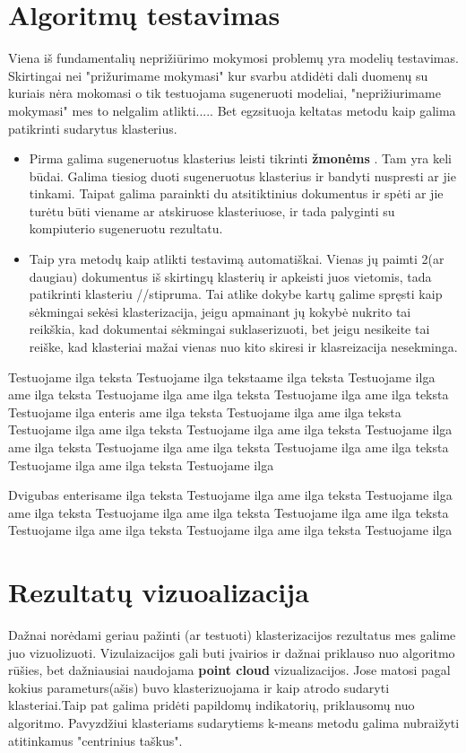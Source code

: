 \documentclass{VUMIFInfKursinis}
\begin{document}
\section{Algoritmų testavimas}
Viena iš fundamentalių neprižiūrimo mokymosi problemų yra modelių testavimas. Skirtingai nei "prižurimame mokymasi" kur svarbu atdidėti dali duomenų su kuriais nėra mokomasi o tik testuojama sugeneruoti modeliai, "neprižiurimame mokymasi" mes to nelgalim atlikti..... Bet egzsituoja keltatas metodu kaip galima patikrinti sudarytus klasterius.
\begin{itemize}
	\item Pirma galima sugeneruotus klasterius leisti tikrinti \textbf{žmonėms }. Tam yra keli būdai. Galima tiesiog duoti sugeneruotus klasterius ir bandyti nuspresti ar jie tinkami. Taipat galima parainkti du atsitiktinius dokumentus ir spėti ar jie turėtu būti viename ar atskiruose klasteriuose, ir tada palyginti su kompiuterio sugeneruotu rezultatu. 
	\item Taip yra metodų kaip atlikti testavimą automatiškai. Vienas jų paimti 2(ar daugiau) dokumentus iš skirtingų klasterių ir apkeisti juos vietomis, tada patikrinti klasteriu //stipruma. Tai atlike dokybe kartų galime spręsti kaip sėkmingai sekėsi klasterizacija, jeigu apmainant jų kokybė nukrito tai reikškia, kad dokumentai sėkmingai suklaserizuoti, bet jeigu nesikeite tai reiške, kad klasteriai mažai vienas nuo kito skiresi ir klasreizacija nesekminga.
\end{itemize}
Testuojame ilga teksta Testuojame ilga tekstaame ilga teksta Testuojame ilga ame ilga teksta Testuojame ilga ame ilga teksta Testuojame ilga ame ilga teksta Testuojame ilga 
enteris ame ilga teksta Testuojame ilga ame ilga teksta Testuojame ilga ame ilga teksta Testuojame ilga ame ilga teksta Testuojame ilga ame ilga teksta Testuojame ilga ame ilga teksta Testuojame ilga ame ilga teksta Testuojame ilga ame ilga teksta Testuojame ilga

Dvigubas enterisame ilga teksta Testuojame ilga ame ilga teksta Testuojame ilga ame ilga teksta Testuojame ilga ame ilga teksta Testuojame ilga ame ilga teksta Testuojame ilga ame ilga teksta Testuojame ilga ame ilga teksta Testuojame ilga 
\section{Rezultatų vizuoalizacija}
Dažnai norėdami geriau pažinti (ar testuoti) klasterizacijos rezultatus mes galime juo vizuolizuoti. Vizulaizacijos gali buti įvairios ir dažnai priklauso nuo algoritmo rūšies, bet dažniausiai naudojama \textbf{point cloud} vizualizacijos. Jose matosi pagal kokius parameturs(ašis) buvo klasterizuojama ir kaip atrodo sudaryti klasteriai.Taip pat galima pridėti papildomų indikatorių, priklausomų nuo algoritmo. Pavyzdžiui klasteriams sudarytiems k-means metodu galima nubraižyti atitinkamus "centrinius taškus".
\end{document}
